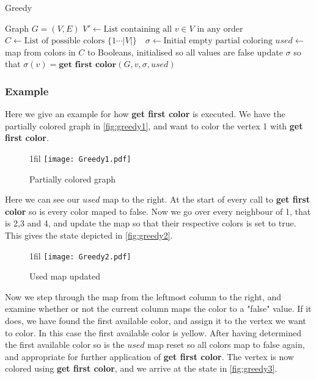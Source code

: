 \documentclass[a4paper]{article}
\makeatletter
\newcommand*{\centerfloat}{%
  \parindent \z@
  \leftskip \z@ \@plus 1fil \@minus \textwidth
  \rightskip\leftskip
  \parfillskip \z@skip}
\makeatother
\begin{document}
\begin{algorithm}[H]
  \caption{Greedy}
  \label{alg:greedy}
  \begin{algorithmic}[1]
      \REQUIRE Graph $G = (V,E)$
      \STATE $V' \leftarrow \text{List containing all $v \in V$ in any order}$
      \STATE $C \leftarrow \text{List of possible colors $\{1 \cdots |V| \}$ }$
      \STATE $\sigma \leftarrow \text{Initial empty partial coloring}$
      \STATE $used \leftarrow $ map from colors in $C$ to Booleans, initialised
      so all values are false
        \STATE update $\sigma$ so that  $\sigma(v) = \textbf{get first color}(G,v,\sigma,used)$
    \ENDFOR
  \end{algorithmic}
\end{algorithm}

\subsubsection{Example}

Here we give an example for how \textbf{get first color} is executed.
We have the partially colored graph in \autoref{fig:greedy1}, and want to color the vertex 
1 with \textbf{get first color}.

\begin{figure}[H]
    \centerfloat
    \texttt{[image: Greedy1.pdf]}
    \caption{Partially colored graph}
    \label{fig:greedy1}
\end{figure}

Here we can see our $used$ map to the right. At the start of every call to
\textbf{get first color} so is every color maped to false. Now we go over every
neighbour of 1, that is 2,3 and 4, and update the map so that their respective
colors is set to true. This gives the state depicted in \autoref{fig:greedy2}.

\begin{figure}[H]
    \centerfloat
    \texttt{[image: Greedy2.pdf]}
    \caption{Used map updated}
    \label{fig:greedy2}
\end{figure}

Now we step through the map from the leftmost column to the right, and examine
whether or not the current column maps the color to a "false" value. If it does,
we have found the first available color, and assign it to the vertex we want to
color. In this case the first available color is yellow. After having
determined the first available color so is the $used$ map reset so all colors map
to false again, and appropriate for further application of \textbf{get first
color}.  The vertex is now colored using  \textbf{get first color}, and we
arrive at the state in \autoref{fig:greedy3}.
\end{document}
